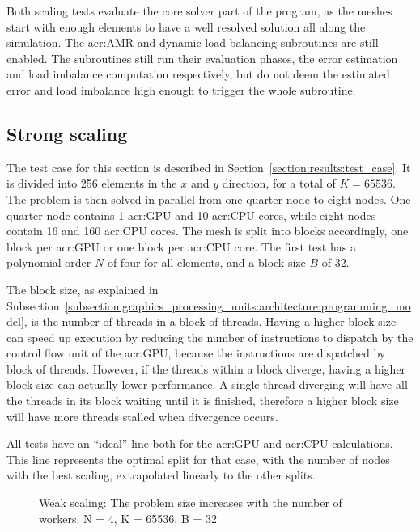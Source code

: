 Both scaling tests evaluate the core solver part of the program, as the meshes start with enough
elements to have a well resolved solution all along the simulation. The \acrlong{acr:AMR} and
dynamic load balancing subroutines are still enabled. The subroutines still run their evaluation
phases, the error estimation and load imbalance computation respectively, but do not deem the
estimated error and load imbalance high enough to trigger the whole subroutine. 

\subsection{Strong scaling}\label{subsection:results:scaling_tests:strong}

The test case for this section is described in Section~\ref{section:results:test_case}. It is
divided into 256 elements in the \(x\) and \(y\) direction, for a total of \(K = 65536\). The
problem is then solved in parallel from one quarter node to eight nodes. One quarter node contains 1
\acrshort{acr:GPU} and 10 \acrshort{acr:CPU} cores, while eight nodes contain 16
 and 160 \acrshort{acr:CPU} cores. The mesh is split into blocks accordingly,
one block per \acrshort{acr:GPU} or one block per \acrshort{acr:CPU} core. The first test has a
polynomial order \(N\) of four for all elements, and a block size \(B\) of 32. 

The block size, as explained in
Subsection~\ref{subsection:graphics_processing_units:architecture:programming_model}, is the number
of threads in a block of threads. Having a higher block size can speed up execution by reducing the
number of instructions to dispatch by the control flow unit of the \acrshort{acr:GPU}, because the
instructions are dispatched by block of threads. However, if the threads within a block diverge,
having a higher block size can actually lower performance. A single thread diverging will have all
the threads in its block waiting until it is finished, therefore a higher block size will have more
threads stalled when divergence occurs.

All tests have an ``ideal'' line both for the \acrshort{acr:GPU} and \acrshort{acr:CPU}
calculations. This line represents the optimal split for that case, with the number of nodes with
the best scaling, extrapolated linearly to the other splits.

\begin{figure}[H]
	\centering
	
	\caption{Weak scaling: The problem size increases with the number of workers. N = 4, K = 65536, B = 32}\label{fig:strong_scaling_N4_W32}
\end{figure}

